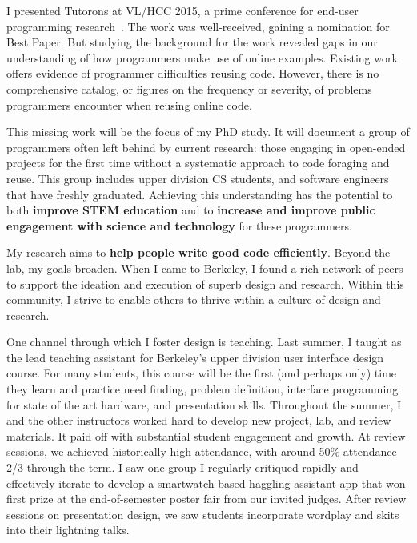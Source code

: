 \documentclass[12pt]{memoir}
\begin{document}
I presented Tutorons at VL/HCC 2015, a prime conference for end-user programming research~\cite{head_tutorons_2015}.
The work was well-received, gaining a nomination for Best Paper.
But studying the background for the work revealed gaps in our understanding of how programmers make use of online examples.
Existing work offers evidence of programmer difficulties reusing code.
However, there is no comprehensive catalog, or figures on the frequency or severity, of problems programmers encounter when reusing online code.

This missing work will be the focus of my PhD study.
It will document a group of programmers often left behind by current research:
those engaging in open-ended projects for the first time without a systematic approach to code foraging and reuse.
This group includes upper division CS students, and software engineers that have freshly graduated.
Achieving this understanding has the potential to both \textbf{improve STEM education} and to \textbf{increase and improve public engagement with science and technology} for these programmers.


My research aims to \textbf{help people write good code efficiently}.
Beyond the lab, my goals broaden.
When I came to Berkeley, I found a rich network of peers to support the ideation and execution of superb design and research.
Within this community, I strive to enable others to thrive within a culture of design and research.

One channel through which I foster design is teaching.
Last summer, I taught as the lead teaching assistant for Berkeley's upper division user interface design course.
For many students, this course will be the first (and perhaps only) time they learn and practice need finding, problem definition, interface programming for state of the art hardware, and presentation skills.
Throughout the summer, I and the other instructors worked hard to develop new project, lab, and review materials.
It paid off with substantial student engagement and growth.
At review sessions, we achieved historically high attendance, with around 50\% attendance 2/3 through the term.
I saw one group I regularly critiqued rapidly and effectively iterate to develop a smartwatch-based haggling assistant app that won first prize at the end-of-semester poster fair from our invited judges.
After review sessions on presentation design, we saw students incorporate wordplay and skits into their lightning talks.
\end{document}
